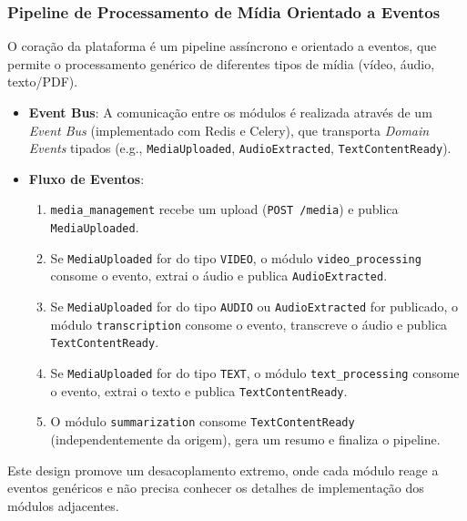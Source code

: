 \subsubsection{Pipeline de Processamento de Mídia Orientado a Eventos}
O coração da plataforma é um pipeline assíncrono e orientado a eventos, que permite o processamento genérico de diferentes tipos de mídia (vídeo, áudio, texto/PDF).
\begin{itemize}
    \item \textbf{Event Bus}: A comunicação entre os módulos é realizada através de um \textit{Event Bus} (implementado com Redis e Celery), que transporta \textit{Domain Events} tipados (e.g., \texttt{MediaUploaded}, \texttt{AudioExtracted}, \texttt{TextContentReady}).
    \item \textbf{Fluxo de Eventos}:
    \begin{enumerate}
        \item \texttt{media\_management} recebe um upload (\texttt{POST /media}) e publica \texttt{MediaUploaded}.
        \item Se \texttt{MediaUploaded} for do tipo \texttt{VIDEO}, o módulo \texttt{video\_processing} consome o evento, extrai o áudio e publica \texttt{AudioExtracted}.
        \item Se \texttt{MediaUploaded} for do tipo \texttt{AUDIO} ou \texttt{AudioExtracted} for publicado, o módulo \texttt{transcription} consome o evento, transcreve o áudio e publica \texttt{TextContentReady}.
        \item Se \texttt{MediaUploaded} for do tipo \texttt{TEXT}, o módulo \texttt{text\_processing} consome o evento, extrai o texto e publica \texttt{TextContentReady}.
        \item O módulo \texttt{summarization} consome \texttt{TextContentReady} (independentemente da origem), gera um resumo e finaliza o pipeline.
    \end{enumerate}
\end{itemize}
Este design promove um desacoplamento extremo, onde cada módulo reage a eventos genéricos e não precisa conhecer os detalhes de implementação dos módulos adjacentes.

